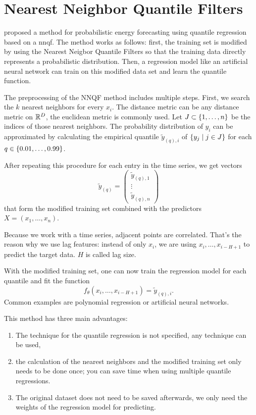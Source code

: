 \section{Nearest Neighbor Quantile Filters}
\label{sec:nnqf}

\Textcite{Ordiano2019} proposed a method for probabilistic 
energy forecasting using quantile regression based on a \gls{nnqf}. 
The method works as follows: first, the training set is modified 
by using the Nearest Neigbor Quantile Filters so that 
the training data directly represents a probabilistic distribution. 
Then, a regression model like an artificial neural network can 
train on this modified data set and learn the quantile function.

The preprocessing of the NNQF method includes multiple steps. 
First, we search the \(k\) nearest neighbors 
for every \(x_i\).
The distance metric can be any distance metric on \(\mathbb{R}^D\), 
the euclidean metric is commonly used.
Let \(J \subset \{1, \ldots, n\}\) be the indices of 
those nearest neighbors. 
The probability distribution of \(y_i\) can be approximated 
by calculating the empirical quantile \(\tilde{y}_{(q),i}\) of 
\(\{y_j \;|\; j\in J\}\) for each \(q \in \{0.01, \ldots, 0.99\}\). 

After repeating this procedure for each entry in the time series, 
we get vectors 
\[ \tilde{y}_{(q)} = \begin{pmatrix}
    \tilde{y}_{(q), 1} \\ 
    \vdots \\
    \tilde{y}_{(q), n}
\end{pmatrix} \]
that form the modified training set combined with the 
predictors \(X = (x_1, \ldots, x_n)\).

Because we work with a time series, adjacent points are correlated. 
That's the reason why we use lag features: 
instead of only \(x_i\), we are using \(x_i, \ldots, x_{i-H+1}\) to 
predict the target data. \(H\) is called lag size.

With the modified training set, one can now train the regression model 
for each quantile and fit the function 
\[ f_\theta(x_i, \ldots, x_{i-H+1}) = \tilde{y}_{(q), i}. \]
Common examples are polynomial regression or 
artificial neural networks. 

This method has three main advantages: 
\begin{enumerate}
    \item The technique for the quantile regression is not specified, 
    any technique can be used,
    \item the calculation of the nearest neighbors and the modified 
    training set only needs to be done once; you can save time when 
    using multiple quantile regressions. 
    \item The original dataset does not need to be saved afterwards, 
    we only need the weights of the regression model for predicting.
\end{enumerate}

